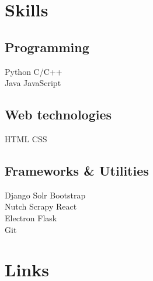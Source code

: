 \documentclass[a4paper]{deedy-resume-openfont}
\begin{document}
\begin{minipage}[t]{0.36\textwidth}

\section{Skills}
\subsection{Programming}
\textbullet{} Python \textbullet{} C/C++ \\
\textbullet{} Java \textbullet{} JavaScript \\
\sectionsep
\subsection{Web technologies}
\textbullet{} HTML \textbullet{} CSS \\
\sectionsep
\subsection{Frameworks \& Utilities}
\textbullet{} Django \textbullet{} Solr \textbullet{} Bootstrap \\
\textbullet{} Nutch \textbullet{} Scrapy \textbullet{} React \\
\textbullet{} Electron \textbullet{} Flask \\
\textbullet{} Git 
\sectionsep

\section{Links} 
\sectionsep

\end{minipage} 
\end{document}
